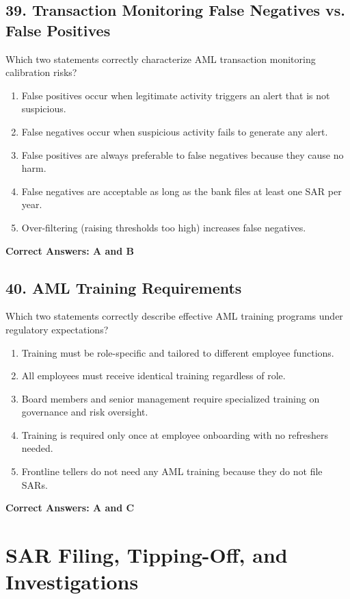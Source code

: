 \documentclass[11pt,a4paper]{article}
\begin{document}
	\subsection{39. Transaction Monitoring False Negatives vs. False Positives}
	Which two statements correctly characterize AML transaction monitoring calibration risks?
	\begin{enumerate}[label=\Alph*.]
		\item False positives occur when legitimate activity triggers an alert that is not suspicious.
		\item False negatives occur when suspicious activity fails to generate any alert.
		\item False positives are always preferable to false negatives because they cause no harm.
		\item False negatives are acceptable as long as the bank files at least one SAR per year.
		\item Over-filtering (raising thresholds too high) increases false negatives.
	\end{enumerate}
	\textbf{Correct Answers: A and B}
	
	\subsection{40. AML Training Requirements}
	Which two statements correctly describe effective AML training programs under regulatory expectations?
	\begin{enumerate}[label=\Alph*.]
		\item Training must be role-specific and tailored to different employee functions.
		\item All employees must receive identical training regardless of role.
		\item Board members and senior management require specialized training on governance and risk oversight.
		\item Training is required only once at employee onboarding with no refreshers needed.
		\item Frontline tellers do not need any AML training because they do not file SARs.
	\end{enumerate}
	\textbf{Correct Answers: A and C}
	
	\section{SAR Filing, Tipping-Off, and Investigations}
	
\end{document}
